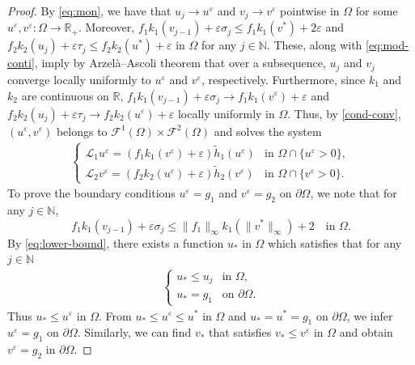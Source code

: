 \documentclass[11pt,oneside,english]{amsart}
\newcommand{\R}{{\mathbb R}}
\newcommand{\N}{{\mathbb N}}
\newcommand{\cL}{{\mathcal L}}
\newcommand{\cF}{{\mathcal F}}
\newcommand{\e}{\varepsilon}
\numberwithin{equation}{section}
\theoremstyle{plain}
\numberwithin{equation}{section}
\begin{document}
\begin{proof}
By \eqref{eq:mon}, we have that $u_j\to u^\e$ and $v_j\to v^\e$ pointwise in $\Omega$ for some $u^\e,v^\e:\Omega\to \R_+$. Moreover,  $f_1k_1(v_{j-1})+\e \sigma_j\le f_1k_1(v^*)+2\e$ and $f_2k_2(u_j)+\e \tau_j\le f_2k_2(u^*)+\e$ in $\Omega$ for any $j\in \N$. These, along with \eqref{eq:mod-conti}, imply by Arzelà–Ascoli theorem that over a subsequence, $u_j$ and $v_j$ converge locally uniformly to $u^\e$ and $v^\e$, respectively. 
Furthermore, since $k_1$ and $k_2$ are continuous on $\R$, $f_1k_1(v_{j-1})+\e \sigma_j\to f_1k_1(v^\e)+\e$ and $f_2k_2(u_j)+\e \tau_j\to f_2k_2(u^\e)+\e$ locally uniformly in $\Omega$. Thus, by \ref{cond-conv}, $(u^\e,v^\e)$ belongs to $\cF^1(\Omega)\times \cF^2(\Omega)$ and solves the system
\begin{align*}
    \begin{cases}
        \cL_1 u^\e=(f_1k_1(v^\e)+\e)\tilde h_1(u^\e) &\text{in }\Omega\cap\{u^\e>0\},\\
        \cL_2 v^\e=(f_2k_2(u^\e)+\e)\tilde h_2(v^\e) &\text{in }\Omega\cap\{v^\e>0\}.
    \end{cases}
\end{align*}
To prove the boundary conditions $u^\e=g_1$ and $v^\e=g_2$ on $\partial\Omega$, we note that for any $j\in \mathbb{N}$,
$$
f_1k_1(v_{j-1})+\e\sigma_j\le \|f_1\|_\infty k_1(\|v^*\|_\infty)+2\quad\text{in }\Omega.
$$
By \eqref{eq:lower-bound}, there exists a function $u_*$ in $\Omega$ which satisfies that for any $j\in \mathbb{N}$
\begin{align*}
    \begin{cases}
        u_*\le u_j&\text{in }\Omega,\\
        u_*=g_1&\text{on }\partial\Omega.
        \end{cases}
\end{align*}
Thus $u_*\le u^\e$ in $\Omega$. From $u_*\le u^\e\le u^*$ in $\Omega$ and $u_*=u^*=g_1$ on $\partial\Omega$, we infer $u^\e=g_1$ on $\partial\Omega$. Similarly, we can find $v_*$ that satisfies $v_*\le v^\e$ in $\Omega$ and obtain $v^\e=g_2$ in $\partial\Omega$.


\end{proof}
\end{document}
